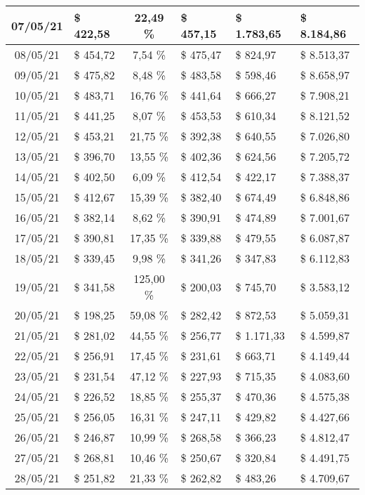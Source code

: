 \begin{center}
\begin{small}
\begin{longtable}{|c|l|c|l|l|l|}
07/05/21 & \$ 422,58 & 22,49 \% & \$ 457,15 & \$ 1.783,65 & \$ 8.184,86 \\ \hline
08/05/21 & \$ 454,72 & 7,54 \% & \$ 475,47 & \$ 824,97 & \$ 8.513,37 \\ \hline
09/05/21 & \$ 475,82 & 8,48 \% & \$ 483,58 & \$ 598,46 & \$ 8.658,97 \\ \hline
10/05/21 & \$ 483,71 & 16,76 \% & \$ 441,64 & \$ 666,27 & \$ 7.908,21 \\ \hline
11/05/21 & \$ 441,25 & 8,07 \% & \$ 453,53 & \$ 610,34 & \$ 8.121,52 \\ \hline
12/05/21 & \$ 453,21 & 21,75 \% & \$ 392,38 & \$ 640,55 & \$ 7.026,80 \\ \hline
13/05/21 & \$ 396,70 & 13,55 \% & \$ 402,36 & \$ 624,56 & \$ 7.205,72 \\ \hline
14/05/21 & \$ 402,50 & 6,09 \% & \$ 412,54 & \$ 422,17 & \$ 7.388,37 \\ \hline
15/05/21 & \$ 412,67 & 15,39 \% & \$ 382,40 & \$ 674,49 & \$ 6.848,86 \\ \hline
16/05/21 & \$ 382,14 & 8,62 \% & \$ 390,91 & \$ 474,89 & \$ 7.001,67 \\ \hline
17/05/21 & \$ 390,81 & 17,35 \% & \$ 339,88 & \$ 479,55 & \$ 6.087,87 \\ \hline
18/05/21 & \$ 339,45 & 9,98 \% & \$ 341,26 & \$ 347,83 & \$ 6.112,83 \\ \hline
19/05/21 & \$ 341,58 & 125,00 \% & \$ 200,03 & \$ 745,70 & \$ 3.583,12 \\ \hline
20/05/21 & \$ 198,25 & 59,08 \% & \$ 282,42 & \$ 872,53 & \$ 5.059,31 \\ \hline
21/05/21 & \$ 281,02 & 44,55 \% & \$ 256,77 & \$ 1.171,33 & \$ 4.599,87 \\ \hline
22/05/21 & \$ 256,91 & 17,45 \% & \$ 231,61 & \$ 663,71 & \$ 4.149,44 \\ \hline
23/05/21 & \$ 231,54 & 47,12 \% & \$ 227,93 & \$ 715,35 & \$ 4.083,60 \\ \hline
24/05/21 & \$ 226,52 & 18,85 \% & \$ 255,37 & \$ 470,36 & \$ 4.575,38 \\ \hline
25/05/21 & \$ 256,05 & 16,31 \% & \$ 247,11 & \$ 429,82 & \$ 4.427,66 \\ \hline
26/05/21 & \$ 246,87 & 10,99 \% & \$ 268,58 & \$ 366,23 & \$ 4.812,47 \\ \hline
27/05/21 & \$ 268,81 & 10,46 \% & \$ 250,67 & \$ 320,84 & \$ 4.491,75 \\ \hline
28/05/21 & \$ 251,82 & 21,33 \% & \$ 262,82 & \$ 483,26 & \$ 4.709,67 \\ \hline

\end{longtable}
\end{small}
\end{center}
